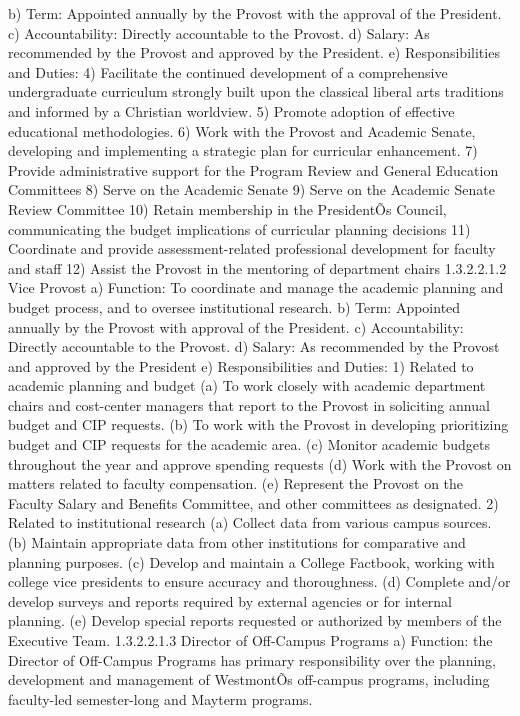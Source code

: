 \documentclass[letterpaper, 11pt]{article}
\begin{document}
b) Term:  Appointed annually by the Provost with the approval of the President.
c) Accountability:  Directly accountable to the Provost.
d) Salary:  As recommended by the Provost and approved by the President.
e) Responsibilities and Duties:
4) Facilitate the continued development of a comprehensive undergraduate curriculum strongly built upon the classical liberal arts traditions and informed by a Christian worldview.
5) Promote adoption of effective educational methodologies.
6) Work with the Provost and Academic Senate, developing and implementing a strategic plan for curricular enhancement.
7) Provide administrative support for the Program Review and General Education Committees
8) Serve on the Academic Senate
9) Serve on the Academic Senate Review Committee
10) Retain membership in the PresidentÕs Council, communicating the budget implications of curricular planning decisions
11) Coordinate and provide assessment-related professional development for faculty and staff
12) Assist the Provost in the mentoring of department chairs
1.3.2.2.1.2 	Vice Provost
a) Function:  To coordinate and manage the academic planning and budget process, and to oversee institutional research.
b) Term:  Appointed annually by the Provost with approval of the President.
c) Accountability:  Directly accountable to the Provost.
d) Salary:  As recommended by the Provost and approved by the President
e) Responsibilities and Duties:
1) Related to academic planning and budget
(a) To work closely with academic department chairs and cost-center managers that report to the Provost in soliciting annual budget and CIP requests.
(b) To work with the Provost in developing prioritizing budget and CIP requests for the academic area.
(c) Monitor academic budgets throughout the year and approve spending requests
(d) Work with the Provost on matters related to faculty compensation.
(e) Represent the Provost on the Faculty Salary and Benefits Committee, and other committees as designated.
2) Related to institutional research
(a) Collect data from various campus sources.
(b) Maintain appropriate data from other institutions for comparative and planning purposes.
(c) Develop and maintain a College Factbook, working with college vice presidents to ensure accuracy and thoroughness.
(d) Complete and/or develop surveys and reports required by external agencies or for internal planning.
(e) Develop special reports requested or authorized by members of the Executive Team.
1.3.2.2.1.3 	Director of Off-Campus Programs
a) Function:  the Director of Off-Campus Programs has primary responsibility over the planning, development and management of WestmontÕs off-campus programs, including faculty-led semester-long and Mayterm programs.
\end{document}
